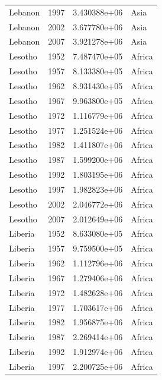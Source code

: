 \documentclass[
  letterpaper,
  DIV=11,
  numbers=noendperiod]{scrreprt}
\begin{document}
\begin{tcolorbox}
\begin{tabular}{lrrl}
Lebanon                  &  1997 &  3.430388e+06 &      Asia \\
Lebanon                  &  2002 &  3.677780e+06 &      Asia \\
Lebanon                  &  2007 &  3.921278e+06 &      Asia \\
Lesotho                  &  1952 &  7.487470e+05 &    Africa \\
Lesotho                  &  1957 &  8.133380e+05 &    Africa \\
Lesotho                  &  1962 &  8.931430e+05 &    Africa \\
Lesotho                  &  1967 &  9.963800e+05 &    Africa \\
Lesotho                  &  1972 &  1.116779e+06 &    Africa \\
Lesotho                  &  1977 &  1.251524e+06 &    Africa \\
Lesotho                  &  1982 &  1.411807e+06 &    Africa \\
Lesotho                  &  1987 &  1.599200e+06 &    Africa \\
Lesotho                  &  1992 &  1.803195e+06 &    Africa \\
Lesotho                  &  1997 &  1.982823e+06 &    Africa \\
Lesotho                  &  2002 &  2.046772e+06 &    Africa \\
Lesotho                  &  2007 &  2.012649e+06 &    Africa \\
Liberia                  &  1952 &  8.633080e+05 &    Africa \\
Liberia                  &  1957 &  9.759500e+05 &    Africa \\
Liberia                  &  1962 &  1.112796e+06 &    Africa \\
Liberia                  &  1967 &  1.279406e+06 &    Africa \\
Liberia                  &  1972 &  1.482628e+06 &    Africa \\
Liberia                  &  1977 &  1.703617e+06 &    Africa \\
Liberia                  &  1982 &  1.956875e+06 &    Africa \\
Liberia                  &  1987 &  2.269414e+06 &    Africa \\
Liberia                  &  1992 &  1.912974e+06 &    Africa \\
Liberia                  &  1997 &  2.200725e+06 &    Africa \\

\end{tabular}
\end{tcolorbox}
\end{document}
